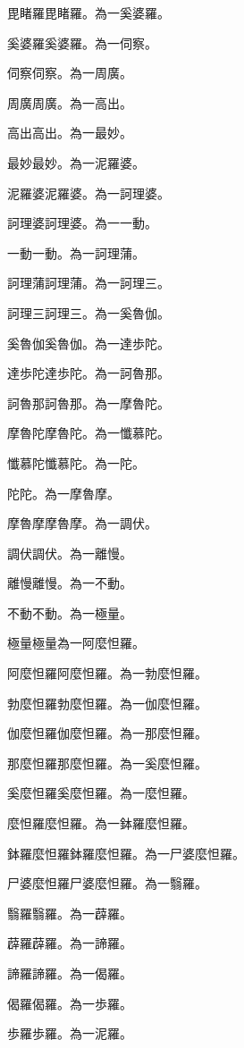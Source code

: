 毘睹羅毘睹羅。為一奚婆羅。\par
奚婆羅奚婆羅。為一伺察。\par
伺察伺察。為一周廣。\par
周廣周廣。為一高出。\par
高出高出。為一最妙。\par
最妙最妙。為一泥羅婆。\par
泥羅婆泥羅婆。為一訶理婆。\par
訶理婆訶理婆。為一一動。\par
一動一動。為一訶理蒲。\par
訶理蒲訶理蒲。為一訶理三。\par
訶理三訶理三。為一奚魯伽。\par
奚魯伽奚魯伽。為一達\xksj@RA 歩陀。\par
達\xksj@RA 歩陀達\xksj@RA 歩陀。為一訶魯那。\par
訶魯那訶魯那。為一摩魯陀。\par
摩魯陀摩魯陀。為一懺慕陀。\par
懺慕陀懺慕陀。為一\xksj@EI \xksj@RA 陀。\par
\xksj@EI \xksj@RA 陀\xksj@EI \xksj@RA 陀。為一摩魯摩。\par
摩魯摩摩魯摩。為一調伏。\par
調伏調伏。為一離\xksj@KYOU 慢。\par
離\xksj@KYOU 慢離\xksj@KYOU 慢。為一不動。\par
不動不動。為一極量。\par
極量極量為一阿麼怛羅。\par
阿麼怛羅阿麼怛羅。為一勃麼怛羅。\par
勃麼怛羅勃麼怛羅。為一伽麼怛羅。\par
伽麼怛羅伽麼怛羅。為一那麼怛羅。\par
那麼怛羅那麼怛羅。為一奚麼怛羅。\par
奚麼怛羅奚麼怛羅。為一\xksj@BEI 麼怛羅。\par
\xksj@BEI 麼怛羅\xksj@BEI 麼怛羅。為一鉢羅麼怛羅。\par
鉢羅麼怛羅鉢羅麼怛羅。為一尸婆麼怛羅。\par
尸婆麼怛羅尸婆麼怛羅。為一翳羅。\par
翳羅翳羅。為一薜羅。\par
薜羅薜羅。為一諦羅。\par
諦羅諦羅。為一偈羅。\par
偈羅偈羅。為一\xksj@SO 歩羅。\par
\xksj@SO 歩羅\xksj@SO 歩羅。為一泥羅。\par
